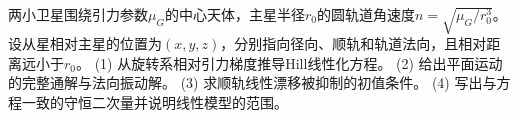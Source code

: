 两小卫星围绕引力参数\(\mu_G\)的中心天体，主星半径\(r_0\)的圆轨道角速度\(n=\sqrt{\mu_G/r_0^3}\)。设从星相对主星的位置为\((x,y,z)\)，分别指向径向、顺轨和轨道法向，且相对距离远小于\(r_0\)。
(1) 从旋转系相对引力梯度推导Hill线性化方程。
(2) 给出平面运动的完整通解与法向振动解。
(3) 求顺轨线性漂移被抑制的初值条件。
(4) 写出与方程一致的守恒二次量并说明线性模型的范围。
